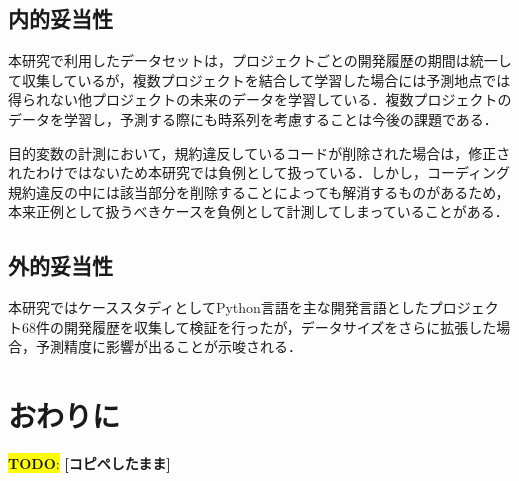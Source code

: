 \documentclass[11pt,dvipdfmx]{jreport}
\newcommand{\todo}[1]{\colorbox{yellow}{{\bf TODO}:}{\color{red} {\textbf{[#1]}}}}
\begin{document}
\section{内的妥当性}

本研究で利用したデータセットは，プロジェクトごとの開発履歴の期間は統一して収集しているが，複数プロジェクトを結合して学習した場合には予測地点では得られない他プロジェクトの未来のデータを学習している．複数プロジェクトのデータを学習し，予測する際にも時系列を考慮することは今後の課題である．

目的変数の計測において，規約違反しているコードが削除された場合は，修正されたわけではないため本研究では負例として扱っている．しかし，コーディング規約違反の中には該当部分を削除することによっても解消するものがあるため，本来正例として扱うべきケースを負例として計測してしまっていることがある．


\section{外的妥当性}

本研究ではケーススタディとしてPython言語を主な開発言語としたプロジェクト68件の開発履歴を収集して検証を行ったが，データサイズをさらに拡張した場合，予測精度に影響が出ることが示唆される．


\chapter{おわりに}\label{chap:end}

\todo{コピペしたまま}

\end{document}
